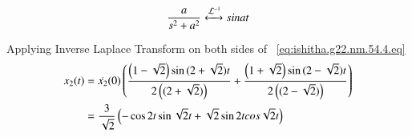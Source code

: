 \documentclass[journal,12pt,twocolumn]{IEEEtran}
\theoremstyle{remark}
\begin{document}
\begin{equation}
\frac{a}{s^2+a^2} \stackrel{}{\xleftrightarrow{\mathcal{L}^{-1}}} sinat
\end{equation}

Applying Inverse Laplace Transform on both sides of ~\eqref{eq:ishitha.g22.nm.54.4.eq}
\begin{align}
x_2(t) &=  \dot{x_2}(0)\left(\frac{\left(1-\sqrt{2}\right)\sin{(2+\sqrt{2})}t}{2\left((2+\sqrt{2})\right)} + \frac{\left(1+\sqrt{2}\right)\sin{(2-\sqrt{2})}t}{2\left((2-\sqrt{2})\right)}\right) \\
&= \frac{3}{\sqrt{2}}\left(-\cos{2t}\sin{\sqrt{2}t} + \sqrt{2}\sin{2t}cos{\sqrt{2}t}\right)
\end{align}
\end{document}

